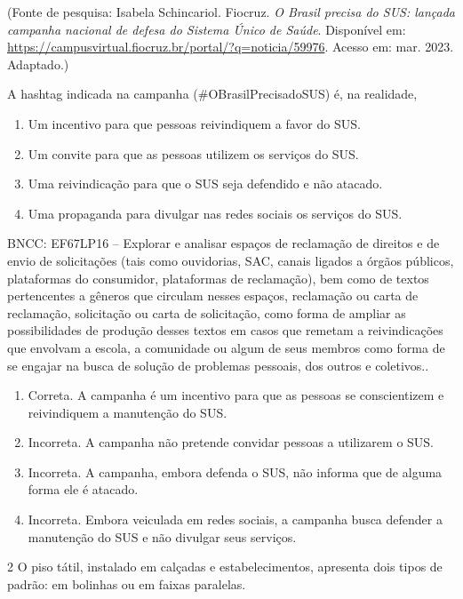 (Fonte de pesquisa: Isabela Schincariol. Fiocruz. \emph{O Brasil precisa
do SUS: lançada campanha nacional de defesa do Sistema Único de Saúde}.
Disponível em: 
\url{https://campusvirtual.fiocruz.br/portal/?q=noticia/59976}.
Acesso em: mar. 2023. Adaptado.)

A hashtag indicada na campanha (\#OBrasilPrecisadoSUS) é, na realidade,

\begin{enumerate}
\def\labelenumi{\alph{enumi})}
\item Um incentivo para que pessoas reivindiquem a favor do SUS.
\item Um convite para que as pessoas utilizem os serviços do SUS.
\item Uma reivindicação para que o SUS seja defendido e não atacado.
\item Uma propaganda para divulgar nas redes sociais os serviços do SUS.
\end{enumerate}

BNCC: EF67LP16 -- Explorar e analisar espaços de reclamação de direitos
e de envio de solicitações (tais como ouvidorias, SAC, canais ligados a
órgãos públicos, plataformas do consumidor, plataformas de reclamação),
bem como de textos pertencentes a gêneros que circulam nesses espaços,
reclamação ou carta de reclamação, solicitação ou carta de solicitação,
como forma de ampliar as possibilidades de produção desses textos em
casos que remetam a reivindicações que envolvam a escola, a comunidade
ou algum de seus membros como forma de se engajar na busca de solução de
problemas pessoais, dos outros e coletivos..

\begin{enumerate}
\def\labelenumi{\alph{enumi})}
\item Correta. A campanha é um incentivo para que as pessoas se
conscientizem e reivindiquem a manutenção do SUS.
\item Incorreta. A campanha não pretende convidar pessoas a utilizarem o
SUS.
\item Incorreta. A campanha, embora defenda o SUS, não informa que de
alguma forma ele é atacado.
\item Incorreta. Embora veiculada em redes sociais, a campanha busca
defender a manutenção do SUS e não divulgar seus serviços.
\end{enumerate}

\num{2} O piso tátil, instalado em calçadas e estabelecimentos,
apresenta dois tipos de padrão: em bolinhas ou em faixas paralelas.

